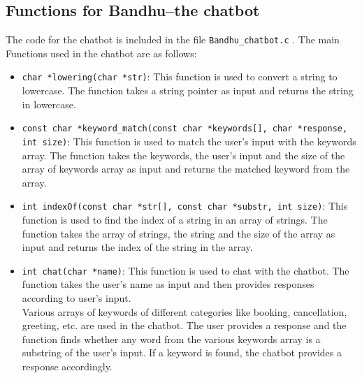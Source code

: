 \documentclass[a4paper]{scrartcl}
\begin{document}
\subsection{Functions for Bandhu--the chatbot}
The code for the chatbot is included in the file  \texttt{Bandhu\_chatbot.c} . The main Functions used in the chatbot are as follows: 

\noindent
    
\begin{itemize}
    \item \texttt{char *lowering(char *str)}: This function is used to convert a string to lowercase. The function takes a string pointer as input and returns the string in lowercase.
    \item \texttt{const char *keyword\_match(const char *keywords[], char *response, int size)}: This function is used to match the user's input with the keywords array. The function takes the keywords, the user's input and the size of the array of keywords array as input and returns the matched keyword from the array.
    \item \texttt{int indexOf(const char *str[], const char *substr, int size)}: This function is used to find the index of a string in an array of strings. The function takes the array of strings, the string and the size of the array as input and returns the index of the string in the array.
    \item \texttt{int chat(char *name)}: This function is used to chat with the chatbot. The function takes the user's name as input and then provides responses according to user's input.\\
    Various arrays of keywords of different categories like booking, cancellation, greeting, etc. are used in the chatbot. The user provides a response and the function finds whether any word from the various keywords array is a substring of the user's input. If a keyword is found, the chatbot provides a response accordingly.
\end{itemize}
\end{document}
